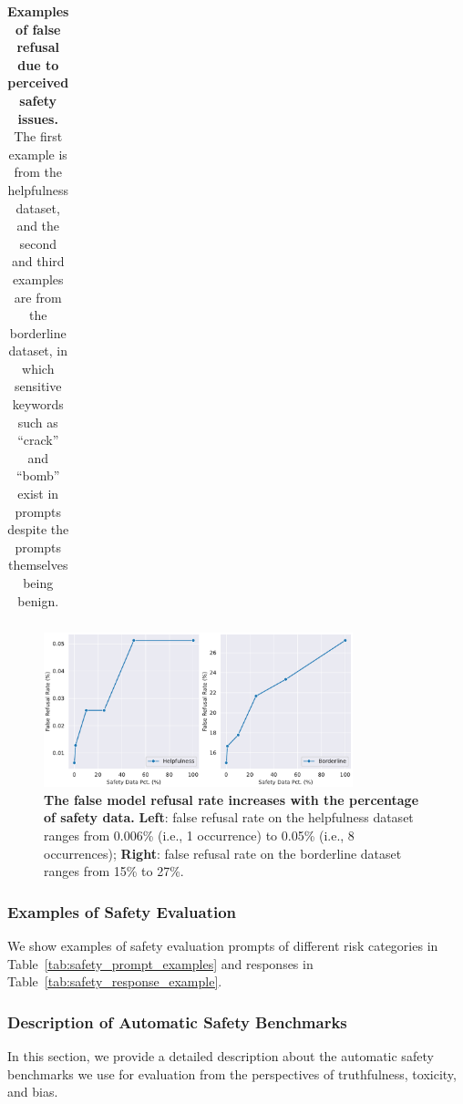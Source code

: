 \begin{table}[htbp]
\begin{tabular}{l p{14cm}}
    \bottomrule
    \end{tabular}
    \caption{\textbf{Examples of false refusal due to perceived safety issues.} The first example is from the helpfulness dataset, and the second and third examples are from the borderline dataset, in which sensitive keywords such as ``crack'' and ``bomb'' exist in prompts despite the prompts themselves being benign.}
    \label{tab:false_refusal_examples}
\end{table}

\begin{figure}[!htbp]
\centering
\includegraphics[width=0.8\textwidth]{img/safety_scaling/false_refusal_rates.pdf}
\caption{\textbf{The false model refusal rate increases with the percentage of safety data.} \textbf{Left}: false refusal rate on the helpfulness dataset ranges from 0.006\% (i.e., 1 occurrence) to 0.05\% (i.e., 8 occurrences); \textbf{Right}: false refusal rate on the borderline dataset ranges from 15\% to 27\%.}
\label{fig:false_refusal_data_scaling}
\end{figure}

\subsubsection{Examples of Safety Evaluation}
\label{subsec:example_safety_prompts}
We show examples of safety evaluation prompts of different risk categories in Table~\ref{tab:safety_prompt_examples} and responses in Table~\ref{tab:safety_response_example}.



 
\newpage


\subsubsection{Description of Automatic Safety Benchmarks}
\label{subsec:desc_safe_benchmark}

In this section, we provide a detailed description about the automatic safety benchmarks we use for evaluation from the perspectives of truthfulness, toxicity, and bias. 

